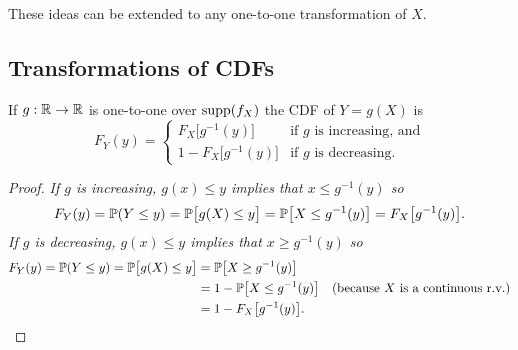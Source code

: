 These ideas can be extended to any one-to-one transformation of $X$.

\subsection{Transformations of CDFs}

\begin{theorem}\label{thm:transf_cdf}
If $g:\mathbb{R}\to\mathbb{R}$ is one-to-one over $\text{supp}(f_X)$ the CDF of $Y=g(X)$ is
\[
F_Y(y) = \begin{cases}
F_X\big[g^{-1}(y)\big]		& \text{if $g$ is increasing, and} \\[1ex]
1 - F_X\big[g^{-1}(y)\big]	& \text{if $g$ is decreasing.} 
\end{cases}
\]
\end{theorem}

\begin{proof}
\ben
\it If $g$ is increasing, $g(x)\leq y$ implies that $x\leq g^{-1}(y)$ so
\[
F_Y(y) 
	= \mathbb{P}(Y\leq y) 
	= \mathbb{P}\big[g(X)\leq y\big] 
	= \mathbb{P}\big[X\leq g^{-1}(y)\big]
	= F_X\big[g^{-1}(y)\big].
\]
\it If $g$ is decreasing, $g(x)\leq y$ implies that $x\geq g^{-1}(y)$ so
\begin{align*}
F_Y(y) 
	= \mathbb{P}(Y\leq y) 
	= \mathbb{P}\big[g(X)\leq y\big] 
	& = \mathbb{P}\big[X\geq g^{-1}(y)\big] \\
	& = 1 - \mathbb{P}\big[X\leq g^{-1}(y)\big] \quad\text{(because $X$ is a continuous r.v.)}\\
	& = 1 - F_X\big[g^{-1}(y)\big].
\end{align*}
\een
\end{proof}	

